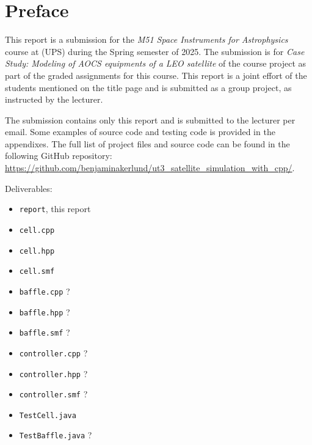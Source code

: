 \section*{Preface}

This report is a submission for the \textit{M51 Space Instruments for Astrophysics} course at (UPS) during the Spring semester of 2025.
The submission is for \textit{Case Study: Modeling of AOCS
equipments of a LEO satellite} of the course project as part of the graded assignments for this course.
This report is a joint effort of the students mentioned on the title page and is submitted as a group project, as instructed by the lecturer.

The submission contains only this report and is submitted to the lecturer per email. 
Some examples of source code and testing code is provided in the appendixes.
The full list of project files and source code can be found in the following GitHub repository: \url{https://github.com/benjaminakerlund/ut3_satellite_simulation_with_cpp/}.


Deliverables:
\begin{itemize}
    \item \texttt{report}, this report
    \item \texttt{cell.cpp}
    \item \texttt{cell.hpp}
    \item \texttt{cell.smf}
    \item \texttt{baffle.cpp} ?
    \item \texttt{baffle.hpp} ? 
    \item \texttt{baffle.smf} ?
    \item \texttt{controller.cpp} ?
    \item \texttt{controller.hpp} ?
    \item \texttt{controller.smf} ?
    \item \texttt{TestCell.java}
    \item \texttt{TestBaffle.java} ? 
\end{itemize}


